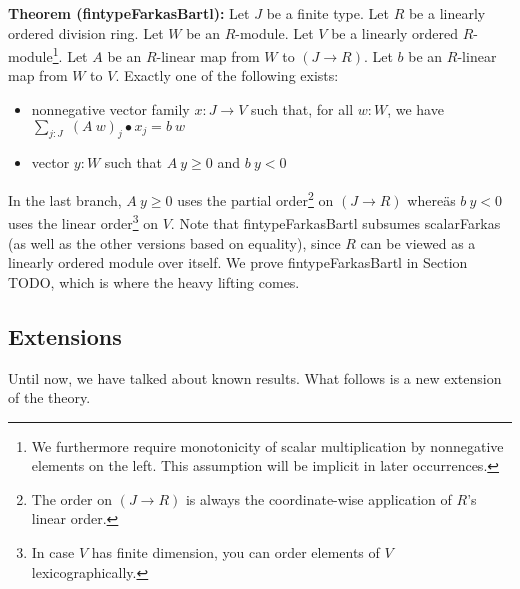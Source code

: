 \documentclass[]{article}
\renewcommand{\.}{\hskip .75pt}
\let\r=\rightarrow
\begin{document}
\medskip \noindent
\textbf{Theorem (fintypeFarkasBartl):}
Let $J$ be a finite type.
Let $R$ be a linearly ordered division ring.
Let $W$ be an $R$-module.
Let $V$ be a linearly ordered $R$-module\footnote{We furthermore require 
monotonicity of scalar multiplication by nonnegative elements on the left.
This assumption will be implicit in later occurrences.}.
Let $A$ be an $R$-linear map from $W$ to $(J \r R)$.
Let $b$ be an $R$-linear map from $W$ to $V$.
Exactly one of the following exists:
\begin{itemize}
\item nonnegative vector family $x : J \r V$ such that, for all $w : W$, we have
$ \sum_{j : J}\; (A~w)_j \bullet x_j = b~w $
\item vector $y : W$ such that $A~y \ge 0$ and $b~y < 0$
\end{itemize}
In the last branch, $A~y \ge 0$ uses the partial order\footnote{The order on $(J \r R)$ is
always the coordinate-wise application of $R$'s linear order.} on $(J \r R)$ whereäs
$b~y < 0$ uses the linear order\footnote{In case $V$ has finite dimension, you can
order elements of $V$ lexicographically.} on $V$.
Note that fintypeFarkasBartl subsumes scalarFarkas (as well as the other versions based on equality),
since $R$ can be viewed as a linearly ordered module over itself.
We prove fintypeFarkasBartl in Section TODO, which is where the heavy lifting comes.


\subsection{Extensions}

Until now, we have talked about known results.
What follows is a new extension of the theory.
\end{document}
